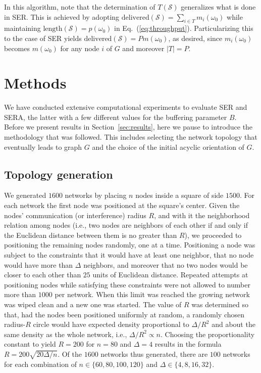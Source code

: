 \documentclass{article}
\begin{document}
In this algorithm, note that the determination of $T(\mathcal{S})$ generalizes
what is done in SER. This is achieved by adopting
$\mathrm{delivered}(\mathcal{S})=\sum_{i\in T}m_i(\omega_0)$ while maintaining
$\mathrm{length}(\mathcal{S})=p(\omega_0)$ in Eq.~(\ref{eq:throughput}).
Particularizing this to the case of SER yields
$\mathrm{delivered}(\mathcal{S})=Pm(\omega_0)$, as desired, since
$m_i(\omega_0)$ becomes $m(\omega_0)$ for any node $i$ of $G$ and moreover
$\vert T\vert=P$.

\section{Methods}\label{sec:methods}

We have conducted extensive computational experiments to evaluate SER and SERA,
the latter with a few different values for the buffering parameter $B$. Before
we present results in Section~\ref{sec:results}, here we pause to introduce the
methodology that was followed. This includes selecting the network topology that
eventually leads to graph $G$ and the choice of the initial acyclic orientation
of $G$.

\subsection{Topology generation}

We generated $1600$ networks by placing $n$ nodes inside a square of side
$1500$. For each network the first node was positioned at the square's center.
Given the nodes' communication (or interference) radius $R$, and with it the
neighborhood relation among nodes (i.e., two nodes are neighbors of each other
if and only if the Euclidean distance between them is no greater than $R$), we
proceeded to positioning the remaining nodes randomly, one at a time.
Positioning a node was subject to the constraints that it would have at least
one neighbor, that no node would have more than $\Delta$ neighbors, and moreover
that no two nodes would be closer to each other than $25$ units of Euclidean
distance. Repeated attempts at positioning nodes while satisfying these
constraints were not allowed to number more than $1000$ per network. When this
limit was reached the growing network was wiped clean and a new one was started.
The value of $R$ was determined so that, had the nodes been positioned uniformly
at random, a randomly chosen radius-$R$ circle would have expected density
proportional to $\Delta/R^2$ and about the same density as the whole network,
i.e., $\Delta/R^2\propto n$. Choosing the proportionality constant to yield
$R=200$ for $n=80$ and $\Delta=4$ results in the formula
$R=200\sqrt{20\Delta/n}$. Of the $1600$ networks thus generated, there are $100$
networks for each combination of $n\in\{60,80,100,120\}$ and
$\Delta\in\{4,8,16,32\}$.
\end{document}
